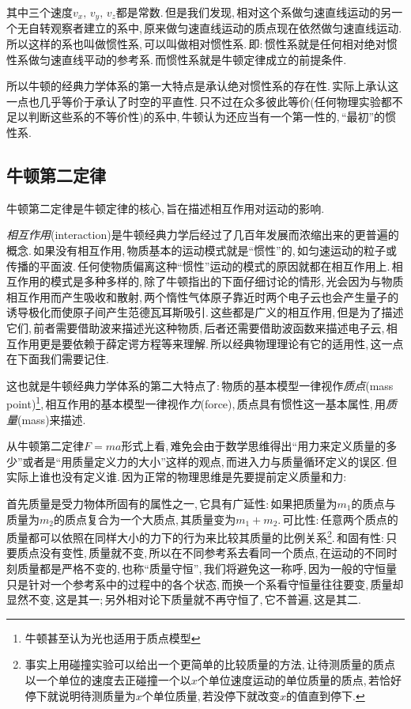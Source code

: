 其中三个速度$v_x,\,v_y,\,v_z$都是常数.\,但是我们发现,\,相对这个系做匀速直线运动的另一个无自转观察者建立的系中,\,原来做匀速直线运动的质点现在依然做匀速直线运动.\,所以这样的系也叫做惯性系,\,可以叫做相对惯性系.\,即:\,惯性系就是任何相对绝对惯性系做匀速直线平动的参考系.\,而惯性系就是牛顿定律成立的前提条件.

所以牛顿的经典力学体系的第一大特点是承认绝对惯性系的存在性.\,实际上承认这一点也几乎等价于承认了时空的平直性.\,只不过在众多彼此等价(任何物理实验都不足以判断这些系的不等价性)的系中,\,牛顿认为还应当有一个第一性的,\,``最初''的惯性系.

\subsection{牛顿第二定律}
牛顿第二定律是牛顿定律的核心,\,旨在描述相互作用对运动的影响.

\emph{相互作用}(interaction)是牛顿经典力学后经过了几百年发展而浓缩出来的更普遍的概念.\,如果没有相互作用,\,物质基本的运动模式就是``惯性''的,\,如匀速运动的粒子或传播的平面波.\,任何使物质偏离这种``惯性''运动的模式的原因就都在相互作用上.\,相互作用的模式是多种多样的,\,除了牛顿指出的下面仔细讨论的情形,\,光会因为与物质相互作用而产生吸收和散射,\,两个惰性气体原子靠近时两个电子云也会产生量子的诱导极化而使原子间产生范德瓦耳斯吸引.\,这些都是广义的相互作用,\,但是为了描述它们,\,前者需要借助波来描述光这种物质,\,后者还需要借助波函数来描述电子云,\,相互作用更是要依赖于薛定谔方程等来理解.\,所以经典物理理论有它的适用性,\,这一点在下面我们需要记住.

这也就是牛顿经典力学体系的第二大特点了:\,物质的基本模型一律视作\emph{质点}(mass point)\footnote{牛顿甚至认为光也适用于质点模型},\,相互作用的基本模型一律视作\emph{力}(force),\,质点具有惯性这一基本属性,\,用\emph{质量}(mass)来描述.

从牛顿第二定律$F=ma$形式上看,\,难免会由于数学思维得出``用力来定义质量的多少''或者是``用质量定义力的大小''这样的观点,\,而进入力与质量循环定义的误区.\,但实际上谁也没有定义谁.\,因为正常的物理思维是先要提前定义质量和力:

首先质量是受力物体所固有的属性之一,\,它具有广延性:\,如果把质量为$m_1$的质点与质量为$m_2$的质点复合为一个大质点,\,其质量变为$m_1+m_2$.\,可比性:\,任意两个质点的质量都可以依照在同样大小的力下的行为来比较其质量的比例关系\footnote{事实上用碰撞实验可以给出一个更简单的比较质量的方法,\,让待测质量的质点以一个单位的速度去正碰撞一个以$x$个单位速度运动的单位质量的质点,\,若恰好停下就说明待测质量为$x$个单位质量,\,若没停下就改变$x$的值直到停下.}.\,和固有性:\,只要质点没有变性,\,质量就不变,\,所以在不同参考系去看同一个质点,\,在运动的不同时刻质量都是严格不变的,\,也称``质量守恒'',\,我们将避免这一称呼,\,因为一般的守恒量只是针对一个参考系中的过程中的各个状态,\,而换一个系看守恒量往往要变,\,质量却显然不变,\,这是其一;\,另外相对论下质量就不再守恒了,\,它不普遍,\,这是其二.

